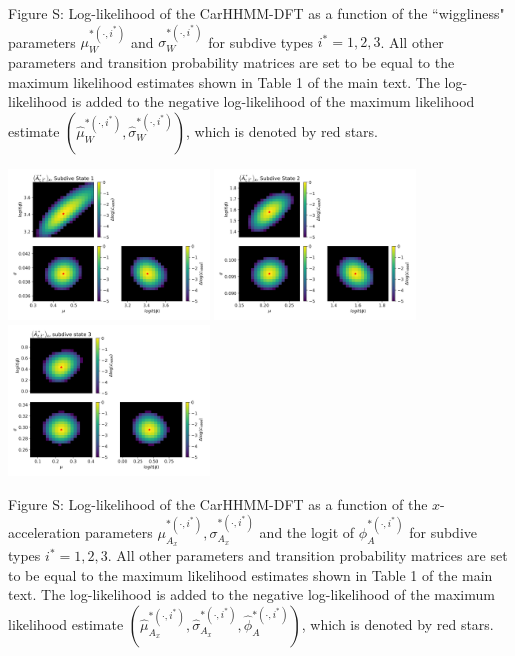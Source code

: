\documentclass{article}
\begin{document}
        \noindent Figure S: Log-likelihood of the CarHHMM-DFT as a function of the ``wiggliness" parameters $\mu_W^{*(\cdot,i^*)}$ and $\sigma_W^{*(\cdot,i^*)}$ for subdive types $i^* = 1,2,3$. All other parameters and transition probability matrices are set to be equal to the maximum likelihood estimates shown in Table 1 of the main text. The log-likelihood is added to the negative log-likelihood of the maximum likelihood estimate $(\hat \mu_W^{*(\cdot,i^*)}, \hat \sigma_W^{*(\cdot,i^*)})$, which is denoted by red stars.
        \addtocounter{fignum}{1}
        
        \newpage
        
        \begin{center}
        \includegraphics[width=2.1in]{../Plots/2019/20190902-182840-CATs_OB_1_0_267_CarHHMM2_fine-theta-likelihood-Ax-0.png}
        \includegraphics[width=2.1in]{../Plots/2019/20190902-182840-CATs_OB_1_0_267_CarHHMM2_fine-theta-likelihood-Ax-1.png}
        \includegraphics[width=2.1in]{../Plots/2019/20190902-182840-CATs_OB_1_0_267_CarHHMM2_fine-theta-likelihood-Ax-2.png}
        \end{center}
        
        \noindent Figure S: Log-likelihood of the CarHHMM-DFT as a function of the $x$-acceleration parameters $\mu_{A_x}^{*(\cdot,i^*)}, \sigma_{A_x}^{*(\cdot,i^*)}$ and the logit of $\phi_{A}^{*(\cdot,i^*)}$ for subdive types $i^* = 1,2,3$. All other parameters and transition probability matrices are set to be equal to the maximum likelihood estimates shown in Table 1 of the main text. The log-likelihood is added to the negative log-likelihood of the maximum likelihood estimate $(\hat \mu_{A_x}^{*(\cdot,i^*)}, \hat \sigma_{A_x}^{*(\cdot,i^*)}, \hat \phi_{A}^{*(\cdot,i^*)})$, which is denoted by red stars.
        \addtocounter{fignum}{1}
        
\end{document}
